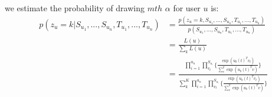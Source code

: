 \documentclass[11pt]{article}
\begin{document}


we estimate the probability of drawing $mth$ $\alpha$ for user $u$ is: 
\begin{align}
p(z_u=k|S_{u_1}, ..., S_{u_n}, T_{u_1}, ..., T_{u_n}) & = \frac{p(z_u=k,S_{u_1}, ..., S_{u_n}, T_{u_1}, ..., T_{u_n})}{p(S_{u_1}, ..., S_{u_n}, T_{u_1}, ..., T_{u_n})} \\
& = \frac{L(u)}{\sum_k L(u)} \\
& = \frac{\prod^{u_n}_{i=1}\prod^{S_{u_i}}_{v_t}\Big\{\frac{\exp(u_b(t)^Tv_t)}{\sum_v^{V} \exp(u_b(t)^Tv)}  \Big\}}{\sum_k^{K}\prod^{u_n}_{i=1}\prod^{S_{u_i}}_{v_t}\Big\{\frac{\exp(u_b(t)^Tv_t)}{\sum_v^V \exp(u_b(t)^Tv)} \Big\}}
\end{align}
\end{document}
